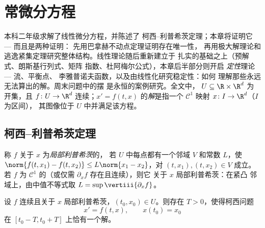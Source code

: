 \chapter{常微分方程}\label{ch:b3:ode}

本科二年级求解了线性微分方程，并陈述了
柯西--利普希茨定理；本章将证明它 --- 而且是两种证明：
先用巴拿赫不动点定理证明存在唯一性，
再用极大解理论和
逃逸紧集定理研究整体结构。线性理论随后重新建立于
扎实的基础之上（预解式、朗斯基行列式、矩阵
指数、杜阿梅尔公式），本章后半部分则开启
\emph{定性}理论 --- 流、平衡点、
李雅普诺夫函数，以及由线性化研究稳定性：如何
理解那些永远无法算出的解。周末问题中的摆
是永恒的案例研究。全文中，
$U \subseteq \R\times\R^d$ 为开集，且 $f \colon U \to \R^d$
连续；$x' = f(t, x)$ 的\emph{解}是指一个
$\mathcal C^1$ 映射 $x \colon I \to \R^d$（$I$ 为区间），
其图像位于 $U$ 中并满足该方程。

\section{柯西--利普希茨定理}

\begin{definition}\label{def:b3:ode:lipschitz}
称 $f$ 关于 $x$ 为\emph{局部利普希茨}的，
若 $U$ 中每点都有一个邻域 $V$ 和常数
$L$，使 $\norm{f(t, x_1) - f(t, x_2)} \leq L\norm{x_1 -
x_2}$，对 $(t, x_1), (t, x_2) \in V$ 成立。若 $f$ 为 $\mathcal
C^1$ 的（或仅需 $\partial_xf$ 存在且连续），则它
关于 $x$ 局部利普希茨：在紧凸
邻域上，由中值不等式取 $L =
\sup\vertiii{\partial_xf}$。
\end{definition}

\begin{theorem}[柯西--利普希茨，局部]
\label{thm:b3:ode:cauchylipschitz}
设 $f$ 连续且关于 $x$ 局部利普希茨，$(t_0,
x_0) \in U$。则存在 $T > 0$，使得柯西问题
\[
x' = f(t, x), \qquad x(t_0) = x_0
\]
在 $[t_0 - T, t_0 +
T]$ 上恰有一个解。
\end{theorem}

